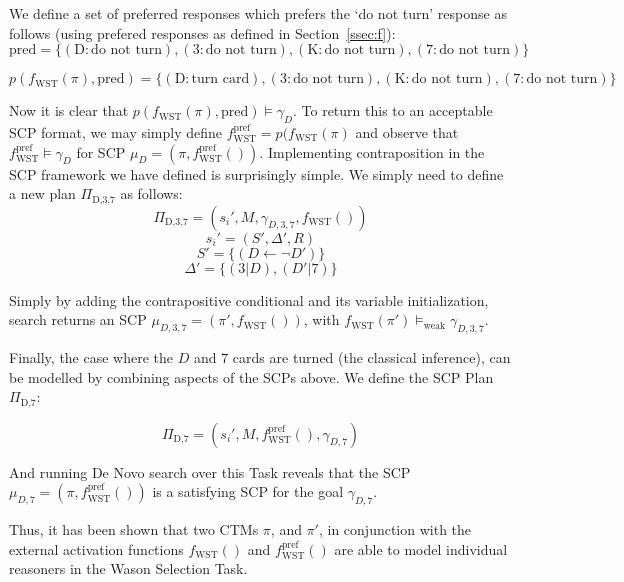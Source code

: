 We define a set of preferred responses which prefers the `do not turn' response as follows (using prefered responses as defined in Section~\ref{ssec:f}):
\[
\text{pred}=\{(\text{D}:\text{do not turn}),(\text{3}:\text{do not turn}),(\text{K}:\text{do not turn}),(\text{7}:\text{do not turn})\}
\]


\[
p(f_\text{WST}(\pi),\text{pred})=\{(\text{D}:\text{turn card}),(\text{3}:\text{do not turn}),(\text{K}:\text{do not turn}),(\text{7}:\text{do not turn})\}
\]

Now it is clear that $p(f_\text{WST}(\pi),\text{pred})\models \gamma_D$. To return this to an acceptable SCP format, we may simply define $f_\text{WST}^\text{pref}=p(f_\text{WST}(\pi)$ and observe that $f_\text{WST}^\text{pref}\models \gamma_D$ for SCP $\mu_D=(\pi, f_\text{WST}^\text{pref}())$.
Implementing contraposition in the SCP framework we have defined is surprisingly simple. We simply need to define a new plan $\Pi_\text{D,3,7}$ as follows:
\[
\Pi_\text{D,3,7} = (s_i', M, \gamma_{D,3,7}, f_\text{WST}())
\]
\[
s_i'=(S', \Delta', R)
\]
\[
S'=\{(D \leftarrow \lnot D')\}
\]
\[
\Delta'=\{(3|D),(D'|7)\}
\]

Simply by adding the contrapositive conditional and its variable initialization, search returns an SCP $\mu_{D,3,7}=(\pi', f_\text{WST}())$, with $f_\text{WST}(\pi')\models_\text{weak} \gamma_{D,3,7}$. %

Finally, the case where the $D$ and $7$ cards are turned (the classical inference), can be modelled by combining aspects of the SCPs above. We define the SCP Plan $\Pi_\text{D,7}$:


\[
\Pi_\text{D,7} = (s_i', M, f_\text{WST}^\text{pref}(), \gamma_{D,7})
\]

And running De Novo search over this Task reveals that the SCP $\mu_{D,7}=(\pi, f_\text{WST}^\text{pref}())$ is a satisfying SCP for the goal $\gamma_{D,7}$. %

Thus, it has been shown that two CTMs $\pi$, and $\pi'$, in conjunction with the external activation functions $f_\text{WST}()$ and $f_\text{WST}^\text{pref}()$ are able to model individual reasoners in the Wason Selection Task.













